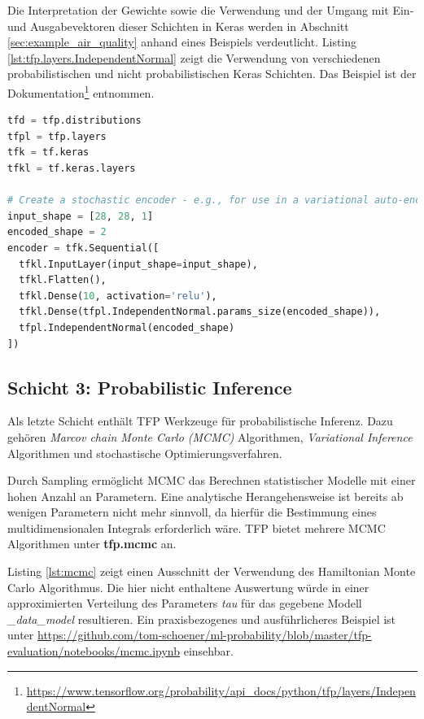 \documentclass[12pt]{article}
\begin{document}
Die Interpretation der Gewichte sowie die Verwendung und der Umgang mit Ein- und Ausgabevektoren dieser Schichten in Keras werden in Abschnitt \ref{sec:example_air_quality} anhand eines Beispiels verdeutlicht. Listing \ref{lst:tfp.layers.IndependentNormal} zeigt die Verwendung von verschiedenen probabilistischen und nicht probabilistischen Keras Schichten. Das Beispiel ist der Dokumentation\footnote{\url{https://www.tensorflow.org/probability/api_docs/python/tfp/layers/IndependentNormal}} entnommen. 

\begin{lstlisting}[language=Python, caption={Beispiel probabilistischer und nicht probabilistischer Keras Schichten}, label={lst:tfp.layers.IndependentNormal}]
tfd = tfp.distributions
tfpl = tfp.layers
tfk = tf.keras
tfkl = tf.keras.layers

# Create a stochastic encoder - e.g., for use in a variational auto-encoder
input_shape = [28, 28, 1]
encoded_shape = 2
encoder = tfk.Sequential([
  tfkl.InputLayer(input_shape=input_shape),
  tfkl.Flatten(),
  tfkl.Dense(10, activation='relu'),
  tfkl.Dense(tfpl.IndependentNormal.params_size(encoded_shape)),
  tfpl.IndependentNormal(encoded_shape)
])
\end{lstlisting}

\subsection{Schicht 3: Probabilistic Inference}
\label{sec:layer3}
Als letzte Schicht enthält TFP Werkzeuge für probabilistische Inferenz. Dazu gehören \textit{Marcov chain Monte Carlo (MCMC)} Algorithmen, \textit{Variational Inference} Algorithmen und stochastische Optimierungsverfahren. 

Durch Sampling ermöglicht MCMC das Berechnen statistischer Modelle mit einer hohen Anzahl an Parametern. Eine analytische Herangehensweise ist bereits ab wenigen Parametern nicht mehr sinnvoll, da hierfür die Bestimmung eines multidimensionalen Integrals erforderlich wäre. TFP bietet mehrere MCMC Algorithmen unter \textbf{tfp.mcmc} an. 

Listing \ref{lst:mcmc} zeigt einen Ausschnitt der Verwendung des Hamiltonian Monte Carlo Algorithmus. Die hier nicht enthaltene Auswertung würde in einer approximierten Verteilung des Parameters \textit{tau} für das gegebene Modell \textit{\_data\_model} resultieren. Ein praxisbezogenes und ausführlicheres Beispiel ist unter \url{https://github.com/tom-schoener/ml-probability/blob/master/tfp-evaluation/notebooks/mcmc.ipynb} einsehbar.
\end{document}
